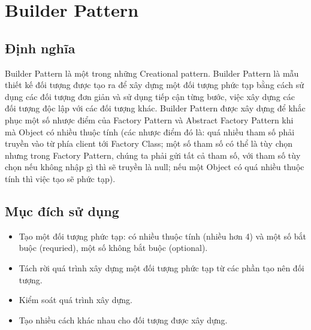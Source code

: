 \chapter{Builder Pattern}

\section{Định nghĩa}
Builder Pattern là một trong những Creational pattern. Builder Pattern là mẫu thiết kế đối tượng được tạo ra để xây dựng một đối tượng phức tạp bằng cách sử dụng các đối tượng đơn giản và sử dụng tiếp cận từng bước, việc xây dựng các đối tượng độc lập với các đối tượng khác. Builder Pattern được xây dựng để khắc phục một số nhược điểm của Factory Pattern và Abstract Factory Pattern khi mà Object có nhiều thuộc tính (các nhược điểm đó là: quá nhiều tham số phải truyền vào từ phía client tới Factory Class; một số tham số có thể là tùy chọn nhưng trong Factory Pattern, chúng ta phải gửi tất cả tham số, với tham số tùy chọn nếu không nhập gì thì sẽ truyền là null; nếu một Object có quá nhiều thuộc tính thì việc tạo sẽ phức tạp).

\section{Mục đích sử dụng}
\begin{itemize}
\item Tạo một đối tượng phức tạp: có nhiều thuộc tính (nhiều hơn 4) và một số bắt buộc (requried), một số không bắt buộc (optional).
\item Tách rời quá trình xây dựng một đối tượng phức tạp từ các phần tạo nên đối tượng.
\item Kiểm soát quá trình xây dựng.
\item Tạo nhiều cách khác nhau cho đối tượng được xây dựng.
\end{itemize}

